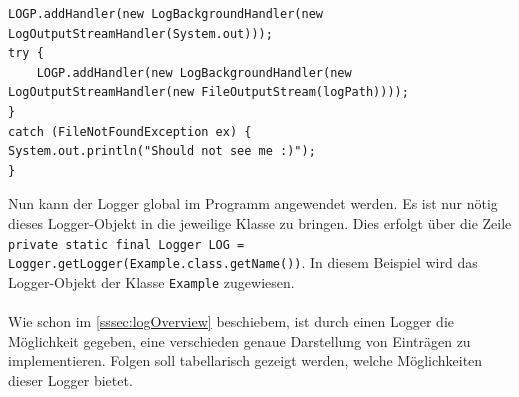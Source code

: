 \begin{lstlisting}[style=java,caption=Java-Codebeispiel,label=loggerOutput]
LOGP.addHandler(new LogBackgroundHandler(new LogOutputStreamHandler(System.out)));
try {
    LOGP.addHandler(new LogBackgroundHandler(new LogOutputStreamHandler(new FileOutputStream(logPath))));
}
catch (FileNotFoundException ex) {
System.out.println("Should not see me :)");
}
\end{lstlisting}
Nun kann der Logger global im Programm angewendet werden.
Es ist nur nötig dieses Logger-Objekt in die jeweilige Klasse zu bringen.
Dies erfolgt über die Zeile \lstinline[style=java]{private static final Logger LOG = Logger.getLogger(Example.class.getName())}.
In diesem Beispiel wird das Logger-Objekt der Klasse \lstinline[style=java]{Example} zugewiesen.\\\\
Wie schon im \autoref{sssec:logOverview} beschiebem, ist durch einen Logger die Möglichkeit gegeben, eine verschieden genaue Darstellung von Einträgen zu implementieren.
Folgen soll tabellarisch gezeigt werden, welche Möglichkeiten dieser Logger bietet.
